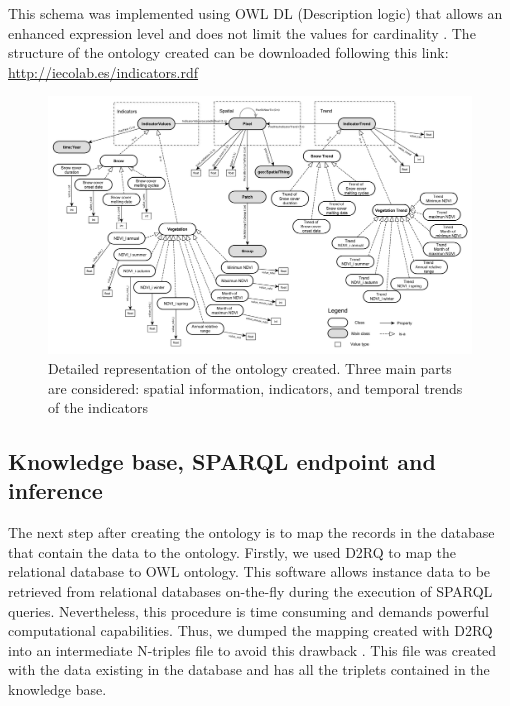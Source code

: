 This schema was implemented using OWL DL (Description logic) that allows an enhanced expression level and does not limit the values for cardinality \autocite{Smithetal2004OWLWeb}. The structure of the ontology created can be downloaded following this link: \url{http://iecolab.es/indicators.rdf}

\begin{figure}
\centering
    \includegraphics[width=\textwidth]{img/onto/onto-ontology}\caption{Detailed representation of the ontology created. Three main parts are considered:  spatial information, indicators, and temporal trends of the indicators}\label{fig:ontology}
\end{figure}

\subsection{Knowledge base, SPARQL endpoint and inference}\label{sec:onto:SPARQL}

The next step after creating the ontology is to map the records in the database that contain the data to the ontology. Firstly, we used D2RQ \autocite{Bizeretal2004D2RQTreating} to map the relational database to OWL ontology. This software allows instance data to be retrieved from relational databases on-the-fly during the execution of SPARQL queries. Nevertheless, this procedure is time consuming and demands powerful computational capabilities. Thus, we dumped the mapping created with D2RQ into an intermediate N-triples file to avoid this drawback \autocite{Sarkaretal2011LinkedData}. This file was created with the data existing in the database and has all the triplets contained in the knowledge base.

